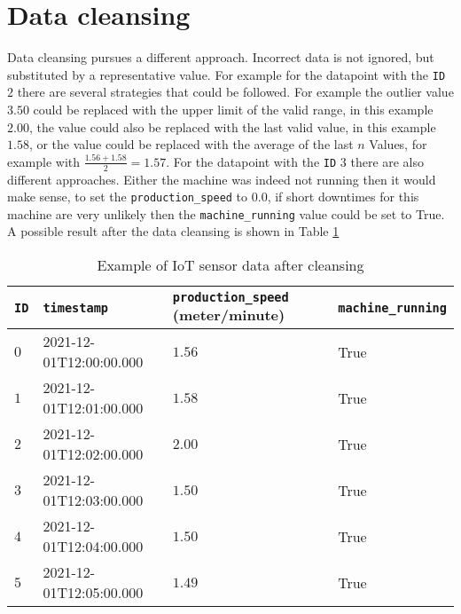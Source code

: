 \section{Data cleansing}
Data cleansing pursues a different approach. Incorrect data is not ignored, but substituted by a representative value. For example for the datapoint with the \verb|ID| $2$ there are several strategies that could be followed. For example the outlier value $3.50$ could be replaced with the upper limit of the valid range, in this example $2.00$, the value could also be replaced with the last valid value, in this example $1.58$, or the value could be replaced with the average of the last $n$ Values, for example with $\frac{1.56+1.58}{2} = 1.57$. For the datapoint with the \verb|ID| $3$ there are also different approaches. Either the machine was indeed not running then it would make sense, to set the \verb|production_speed| to $0.0$, if short downtimes for this machine are very unlikely then the \verb|machine_running| value could be set to True. A possible result after the data cleansing is shown in Table \ref{table:example-iot-data-after-cleansing} \cite{maleticDataCleansingIntegrity2000}
\begin{table}[ht]
\begin{tabular}{|l|l|l|l|}
\hline
\verb|ID| & \verb|timestamp|        & \verb|production_speed| (meter/minute) & \verb|machine_running| \\ \hline
$0$       & 2021-12-01T12:00:00.000 & $1.56$                                 & True                   \\ \hline
$1$       & 2021-12-01T12:01:00.000 & $1.58$                                 & True                   \\ \hline
$2$       & 2021-12-01T12:02:00.000 & $2.00$                                 & True                   \\ \hline
$3$       & 2021-12-01T12:03:00.000 & $1.50$                                 & True                   \\ \hline
$4$       & 2021-12-01T12:04:00.000 & $1.50$                                 & True                   \\ \hline
$5$       & 2021-12-01T12:05:00.000 & $1.49$                                 & True                   \\ \hline
\end{tabular}
\caption{Example of IoT sensor data after cleansing}
\label{table:example-iot-data-after-cleansing}
\end{table}